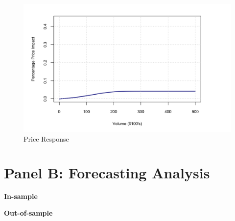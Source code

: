 \begin{figure}[htbp]
    \centering
    \includegraphics[width=1\textwidth]{figures/main_results/price_response.png}
    \caption{Price Response}
    \label{fig:price-response}
\end{figure}















\section{Panel B: Forecasting Analysis}

{\noindent\bfseries In-sample }

{\noindent\bfseries Out-of-sample }
